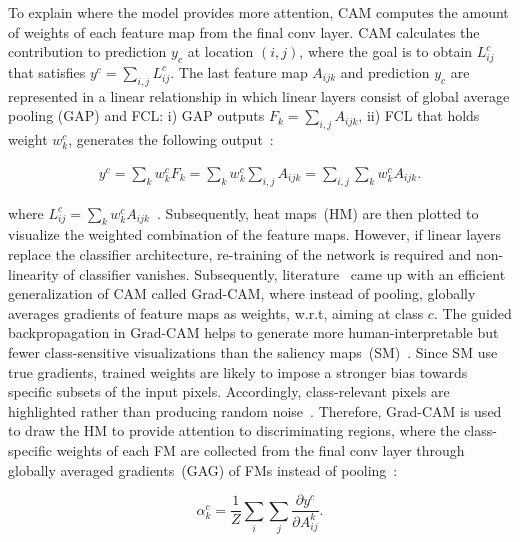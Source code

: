 \hspace*{3.5mm} To explain where the model provides more attention, CAM computes the amount of weights of each feature map from the final conv layer. CAM calculates the contribution to prediction $y_c$ at location $(i,j)$, where the goal is to obtain $L_{ij}^{c}$ that satisfies $y^{c}=\sum_{i, j} L_{ij}^{c}$. The last feature map $A_{ijk}$ and prediction $y_c$ are represented in a linear relationship in which linear layers consist  of global average pooling (GAP) and FCL: i) GAP outputs $F_{k}=\sum_{i,j} A_{ijk}$, ii) FCL that holds weight $w_{k}^{c}$, generates the following output~\cite{kim2020extending}: 
 
 \vspace{-2mm}
 \begin{align}
     y^{c}=\sum_{k} w_{k}^{c} F_{k}=\sum_{k} w_{k}^{c} \sum_{i, j} A_{i j k}=\sum_{i, j} \sum_{k} w_{k}^{c} A_{i j k}.
 \end{align}
 \vspace{-2mm}
 
\noindent where $L_{i j}^{c}=\sum_{k} w_{k}^{c} A_{i j k}$~\cite{kim2020extending}. Subsequently, heat maps~(HM) are then plotted to visualize the weighted combination of the feature maps. However, if linear layers replace the classifier architecture, re-training of the network is required and non-linearity of classifier vanishes. Subsequently, literature~\cite{114} came up with an efficient generalization of CAM called Grad-CAM, where instead of pooling, globally averages gradients of feature maps as weights, w.r.t, aiming at class $c$. The guided backpropagation in Grad-CAM helps to generate more human-interpretable but fewer class-sensitive visualizations than the saliency maps~(SM)~\cite{nie2018theoretical}. Since SM use true gradients, trained weights are likely to impose a stronger bias towards specific subsets of the input pixels. Accordingly, class-relevant pixels are highlighted rather than producing random noise~\cite{nie2018theoretical}. Therefore, Grad-CAM is used to draw the HM to provide attention to discriminating regions, where the class-specific weights of each FM are collected from the final conv layer through globally averaged gradients~(GAG) of FMs instead of pooling~\cite{chattopadhay2018grad}: 

\vspace{-2mm}
\begin{equation}
    \alpha_k^c=\frac{1}{Z}\sum_{i}\sum_{j}\frac{\partial y^c}{\partial A_{ij}^k}.
    \label{eq:alpha}
\end{equation}
\vspace{-2mm}

